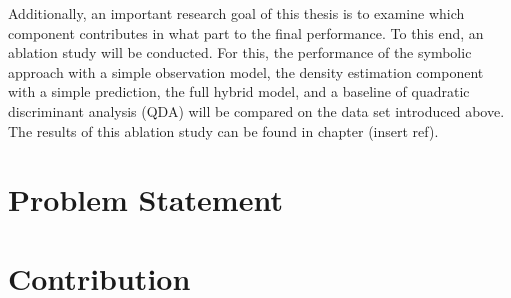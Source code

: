 \documentclass[11pt,titlepage,oneside,openany]{book}
\begin{document}
Additionally, an important research goal of this thesis is to examine which component contributes in what part to the final performance. To this end, an ablation study will be conducted. For this, the performance of the symbolic approach with a simple observation model, the density estimation component with a simple prediction, the full hybrid model, and a baseline of quadratic discriminant analysis (QDA) will be compared on the data set introduced above. The results of this ablation study can be found in chapter (insert ref).

 
\section{Problem Statement}
 

\section{Contribution}
\end{document}
